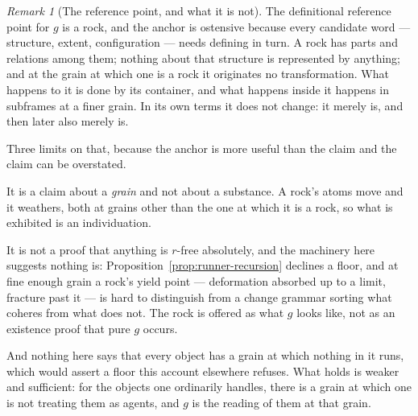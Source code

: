 \documentclass[11pt,a4paper]{article}
\theoremstyle{remark}\newtheorem{remark}[definition]{Remark}
\begin{document}
\begin{remark}[The reference point, and what it is not]\label{rem:rock}
The definitional reference point for $g$ is a rock, and the anchor is ostensive because every
candidate word --- structure, extent, configuration --- needs defining in turn. A rock has parts and
relations among them; nothing about that structure is represented by anything; and at the grain at
which one is a rock it originates no transformation. What happens to it is done by its container, and
what happens inside it happens in subframes at a finer grain. In its own terms it does not change: it
merely is, and then later also merely is.

Three limits on that, because the anchor is more useful than the claim and the claim can be
overstated.

It is a claim about a \emph{grain} and not about a substance. A rock's atoms move and it weathers,
both at grains other than the one at which it is a rock, so what is exhibited is an individuation.

It is not a proof that anything is $r$-free absolutely, and the machinery here suggests nothing is:
Proposition~\ref{prop:runner-recursion} declines a floor, and at fine enough grain a rock's yield
point --- deformation absorbed up to a limit, fracture past it --- is hard to distinguish from a
change grammar sorting what coheres from what does not. The rock is offered as what $g$ looks like,
not as an existence proof that pure $g$ occurs.

And nothing here says that every object has a grain at which nothing in it runs, which would assert a
floor this account elsewhere refuses. What holds is weaker and sufficient: for the objects
one ordinarily handles, there is a grain at which one is not treating them as agents, and $g$ is the
reading of them at that grain.
\end{remark}
\end{document}
